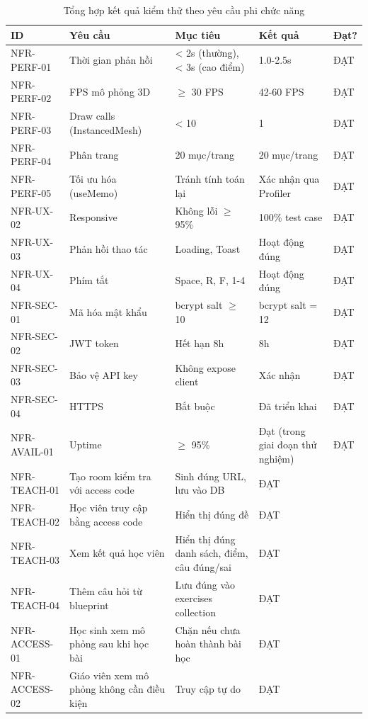 \begin{table}[H]
\centering
\caption{Tổng hợp kết quả kiểm thử theo yêu cầu phi chức năng}
\begin{tabular}{|p{}|p{}|p{}|p{}|p{}|}
\hline
\textbf{ID} & \textbf{Yêu cầu} & \textbf{Mục tiêu} & \textbf{Kết quả} & \textbf{Đạt?} \\
\hline
NFR-PERF-01 & Thời gian phản hồi & < 2s (thường), < 3s (cao điểm) & 1.0-2.5s & ĐẠT \\
\hline
NFR-PERF-02 & FPS mô phỏng 3D & $\geq$ 30 FPS & 42-60 FPS & ĐẠT \\
\hline
NFR-PERF-03 & Draw calls (InstancedMesh) & < 10 & 1 & ĐẠT \\
\hline
NFR-PERF-04 & Phân trang & 20 mục/trang & 20 mục/trang & ĐẠT \\
\hline
NFR-PERF-05 & Tối ưu hóa (useMemo) & Tránh tính toán lại & Xác nhận qua Profiler & ĐẠT \\
\hline
NFR-UX-02 & Responsive & Không lỗi $\geq$ 95\% & 100\% test case & ĐẠT \\
\hline
NFR-UX-03 & Phản hồi thao tác & Loading, Toast & Hoạt động đúng & ĐẠT \\
\hline
NFR-UX-04 & Phím tắt & Space, R, F, 1-4 & Hoạt động đúng & ĐẠT \\
\hline
NFR-SEC-01 & Mã hóa mật khẩu & bcrypt salt $\geq$ 10 & bcrypt salt = 12 & ĐẠT \\
\hline
NFR-SEC-02 & JWT token & Hết hạn 8h & 8h & ĐẠT \\
\hline
NFR-SEC-03 & Bảo vệ API key & Không expose client & Xác nhận & ĐẠT \\
\hline
NFR-SEC-04 & HTTPS & Bắt buộc & Đã triển khai & ĐẠT \\
\hline
NFR-AVAIL-01 & Uptime & $\geq$ 95\% & Đạt (trong giai đoạn thử nghiệm) & ĐẠT \\
\hline
NFR-TEACH-01 & Tạo room kiểm tra với access code & Sinh đúng URL, lưu vào DB & ĐẠT \\
\hline
NFR-TEACH-02 & Học viên truy cập bằng access code & Hiển thị đúng đề & ĐẠT \\
\hline
NFR-TEACH-03 & Xem kết quả học viên & Hiển thị đúng danh sách, điểm, câu đúng/sai & ĐẠT \\
\hline
NFR-TEACH-04 & Thêm câu hỏi từ blueprint & Lưu đúng vào exercises collection & ĐẠT \\
\hline
NFR-ACCESS-01 & Học sinh xem mô phỏng sau khi học bài & Chặn nếu chưa hoàn thành bài học & ĐẠT \\
\hline
NFR-ACCESS-02 & Giáo viên xem mô phỏng không cần điều kiện & Truy cập tự do & ĐẠT \\
\end{tabular}
\end{table}

